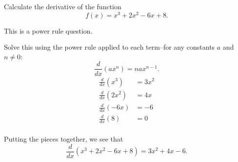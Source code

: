 \documentclass{ximera}
\author{Emma Smith Zbarsky}
\begin{document}
\begin{exercise}

Calculate the derivative of the function \[f(x) = x^3+2x^2-6x+8.\]


\begin{hint}
This is a power rule question.
\end{hint}


\begin{hint}
Solve this using the power rule applied to each term--for any constants
$a$ and $n \neq 0$: \[\frac{d}{dx}\left(ax^n\right) = nax^{n-1}.\]
\begin{align*}
\frac{d}{dx}(x^3) &= 3x^2 \\
\frac{d}{dx}(2x^2) &= 4x \\
\frac{d}{dx}(-6x) &= -6 \\
\frac{d}{dx}(8) &= 0 \\
\end{align*}

Putting the pieces together, we see that
\[\frac{d}{dx}\left(x^3+2x^2-6x+8\right) = \boxed{3x^2+4x-6}.\]
\end{hint}


\begin{multipleChoice}
\end{multipleChoice}

\end{exercise}
\end{document}
